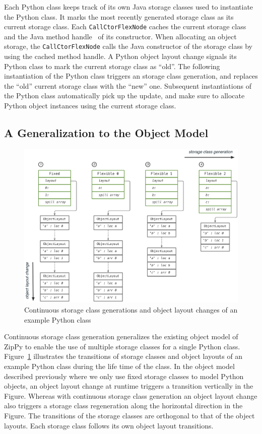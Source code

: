 Each Python class keeps track of its own Java storage classes used to instantiate the Python class.
It marks the most recently generated storage class as its current storage class.
Each \texttt{CallCtorFlexNode} caches the current storage class and the Java method handle~\cite{jdk8} of its constructor.
When allocating an object storage, the \texttt{CallCtorFlexNode} calls the Java constructor of the storage class by using the cached method handle.
A Python object layout change signals its Python class to mark the current storage class as ``old''.
The following instantiation of the Python class triggers an storage class generation, and replaces the ``old'' current storage class with the ``new'' one.
Subsequent instantiations of the Python class automatically pick up the update, and make sure to allocate Python object instances using the current storage class.

\subsection{A Generalization to the Object Model}

\begin{figure}
\centering
\includegraphics[scale=.49]{figures/ch5-object-storage-class-generation-and-object-layout-change}
\caption{Continuous storage class generations and object layout changes of an example Python class}
\label{fig:ch5-object-storage-class-generation-and-object-layout-change}
\end{figure}

Continuous storage class generation generalizes the existing object model of ZipPy to enable the use of multiple storage classes for a single Python class.
Figure~\ref{fig:ch5-object-storage-class-generation-and-object-layout-change} illustrates the transitions of storage classes and object layouts of an example Python class during the life time of the class.
In the object model described previously where we only use fixed storage classes to model Python objects, an object layout change at runtime triggers a transition vertically in the Figure.
Whereas with continuous storage class generation an object layout change also triggers a storage class regeneration along the horizontal direction in the Figure.
The transitions of the storage classes are orthogonal to that of the object layouts.
Each storage class follows its own object layout transitions.

